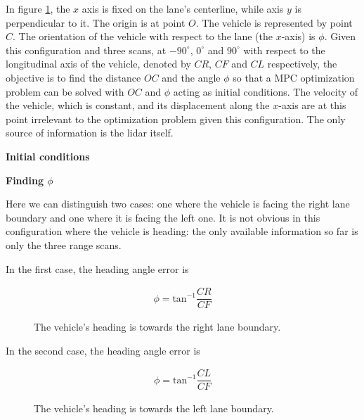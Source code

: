 In figure \ref{fig:centerline_mpc}, the $x$ axis is fixed on the lane's
centerline, while axis $y$ is perpendicular to it. The origin is at point
$O$. The vehicle is represented by point $C$. The orientation of the vehicle
with respect to the lane (the $x$-axis) is $\phi$. Given this configuration
and three scans, at $-90^{\circ}$, $0^{\circ}$ and $90^{\circ}$ with
respect to the longitudinal axis of the vehicle, denoted by $CR$, $CF$ and
$CL$ respectively, the objective is to find the distance $OC$ and the angle
$\phi$ so that a MPC optimization problem can be solved with $OC$ and $\phi$
acting as initial conditions. The velocity of the vehicle,
which is constant, and its displacement along the $x$-axis are at this point
irrelevant to the optimization problem given this configuration. The only
source of information is the lidar itself.

\begin{figure}[H]\centering
  \scalebox{1}{}
  \caption{}
  \label{fig:centerline_mpc}
\end{figure}


\textbf{Initial conditions}

\textbf{Finding $\phi$}

Here we can distinguish two cases: one where the vehicle is facing the right
lane boundary and one where it is facing the left one. It is not obvious
in this configuration where the vehicle is heading: the only available
information so far is only the three range scans.

In the first case, the heading angle error is

\begin{align}
  \phi = \text{tan}^{-1}\dfrac{CR}{CF}
\end{align}

\begin{figure}[H]\centering
  \scalebox{1}{}
  \caption{The vehicle's heading is towards the right lane boundary.}
  \label{}
\end{figure}

In the second case, the heading angle error is

\begin{align}
  \phi = \text{tan}^{-1}\dfrac{CL}{CF}
\end{align}

\begin{figure}[H]\centering
  \scalebox{1}{}
  \caption{The vehicle's heading is towards the left lane boundary.}
  \label{}
\end{figure}

